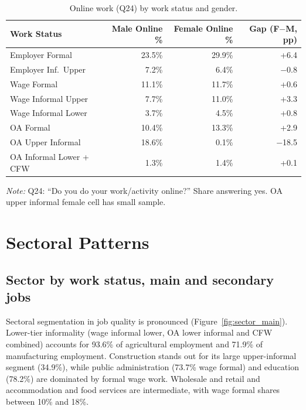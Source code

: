 \documentclass[12pt,a4paper]{article}
\begin{document}
\begin{table}[H]
\centering
\caption{Online work (Q24) by work status and gender.}
\label{tab:online}
\begin{tabular}{lrrr}
\toprule
Work Status & Male Online \% & Female Online \% & Gap (F$-$M, pp) \\
\midrule
Employer Formal        & 23.5\% & 29.9\% & +6.4 \\
Employer Inf.\ Upper   &  7.2\% &  6.4\% & $-$0.8 \\
Wage Formal            & 11.1\% & 11.7\% & +0.6 \\
Wage Informal Upper    &  7.7\% & 11.0\% & +3.3 \\
Wage Informal Lower    &  3.7\% &  4.5\% & +0.8 \\
OA Formal              & 10.4\% & 13.3\% & +2.9 \\
OA Upper Informal      & 18.6\% &  0.1\% & $-$18.5 \\
OA Informal Lower + CFW&  1.3\% &  1.4\% & +0.1 \\
\bottomrule
\end{tabular}

\smallskip
\footnotesize\textit{Note:} Q24: ``Do you do your work/activity online?'' Share answering yes. OA upper informal female cell has small sample.
\end{table}


\section{Sectoral Patterns}
\label{sec:sectors}

\subsection{Sector by work status, main and secondary jobs}

Sectoral segmentation in job quality is pronounced (Figure~\ref{fig:sector_main}). Lower-tier informality (wage informal lower, OA lower informal and CFW combined) accounts for 93.6\% of agricultural employment and 71.9\% of manufacturing employment. Construction stands out for its large upper-informal segment (34.9\%), while public administration (73.7\% wage formal) and education (78.2\%) are dominated by formal wage work. Wholesale and retail and accommodation and food services are intermediate, with wage formal shares between 10\% and 18\%.
\end{document}
